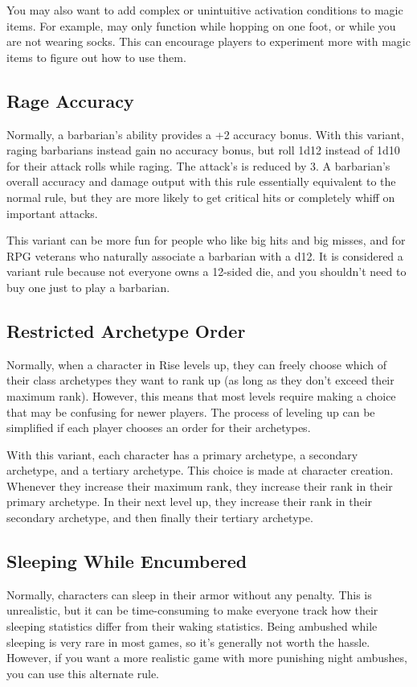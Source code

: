     You may also want to add complex or unintuitive activation conditions to magic items.
    For example,  may only function while hopping on one foot, or while you are not wearing socks.
    This can encourage players to experiment more with magic items to figure out how to use them.

  \subsection{Rage Accuracy}
    Normally, a barbarian's  ability provides a +2 accuracy bonus.
    With this variant, raging barbarians instead gain no accuracy bonus, but roll 1d12 instead of 1d10 for their attack rolls while raging.
    The attack's  is reduced by 3.
    A barbarian's overall accuracy and damage output with this rule essentially equivalent to the normal rule, but they are more likely to get critical hits or completely whiff on important attacks.

    This variant can be more fun for people who like big hits and big misses, and for RPG veterans who naturally associate a barbarian with a d12.
    It is considered a variant rule because not everyone owns a 12-sided die, and you shouldn't need to buy one just to play a barbarian.

  \subsection{Restricted Archetype Order}
    Normally, when a character in Rise levels up, they can freely choose which of their class archetypes they want to rank up (as long as they don't exceed their maximum rank).
    However, this means that most levels require making a choice that may be confusing for newer players.
    The process of leveling up can be simplified if each player chooses an order for their archetypes.

    With this variant, each character has a primary archetype, a secondary archetype, and a tertiary archetype.
    This choice is made at character creation.
    Whenever they increase their maximum rank, they increase their rank in their primary archetype.
    In their next level up, they increase their rank in their secondary archetype, and then finally their tertiary archetype.

  \subsection{Sleeping While Encumbered}
    Normally, characters can sleep in their armor without any penalty.
    This is unrealistic, but it can be time-consuming to make everyone track how their sleeping statistics differ from their waking statistics.
    Being ambushed while sleeping is very rare in most games, so it's generally not worth the hassle.
    However, if you want a more realistic game with more punishing night ambushes, you can use this alternate rule.

